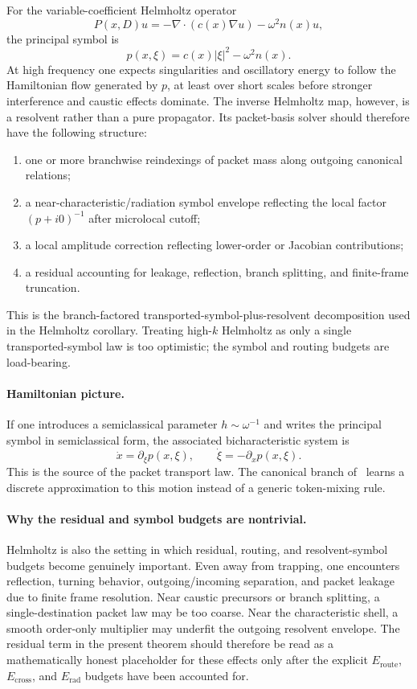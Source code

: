 For the variable-coefficient Helmholtz operator
\[
P(x,D)u = -\nabla\cdot(c(x)\nabla u) - \omega^2 n(x)u,
\]
the principal symbol is
\[
p(x,\xi)=c(x)|\xi|^2 - \omega^2 n(x).
\]
At high frequency one expects singularities and oscillatory energy to follow the Hamiltonian flow generated by $p$, at least over short scales before stronger interference and caustic effects dominate.  The inverse Helmholtz map, however, is a resolvent rather than a pure propagator.  Its packet-basis solver should therefore have the following structure:
\begin{enumerate}
\item one or more branchwise reindexings of packet mass along outgoing canonical relations;
\item a near-characteristic/radiation symbol envelope reflecting the local factor $(p+i0)^{-1}$ after microlocal cutoff;
\item a local amplitude correction reflecting lower-order or Jacobian contributions;
\item a residual accounting for leakage, reflection, branch splitting, and finite-frame truncation.
\end{enumerate}
This is the branch-factored transported-symbol-plus-resolvent decomposition used in the Helmholtz corollary.  Treating high-$k$ Helmholtz as only a single transported-symbol law is too optimistic; the symbol and routing budgets are load-bearing.

\paragraph{Hamiltonian picture.}
If one introduces a semiclassical parameter $h\sim \omega^{-1}$ and writes the principal symbol in semiclassical form, the associated bicharacteristic system is
\[
\dot x = \partial_\xi p(x,\xi),\qquad
\dot \xi = -\partial_x p(x,\xi).
\]
This is the source of the packet transport law. The canonical branch of \MiNO\ learns a discrete approximation to this motion instead of a generic token-mixing rule.

\paragraph{Why the residual and symbol budgets are nontrivial.}
Helmholtz is also the setting in which residual, routing, and resolvent-symbol budgets become genuinely important. Even away from trapping, one encounters reflection, turning behavior, outgoing/incoming separation, and packet leakage due to finite frame resolution. Near caustic precursors or branch splitting, a single-destination packet law may be too coarse. Near the characteristic shell, a smooth order-only multiplier may underfit the outgoing resolvent envelope. The residual term in the present theorem should therefore be read as a mathematically honest placeholder for these effects only after the explicit $E_{\mathrm{route}}$, $E_{\mathrm{cross}}$, and $E_{\mathrm{rad}}$ budgets have been accounted for.

